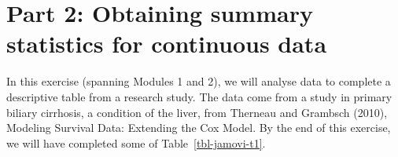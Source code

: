\documentclass[
  a4paper,
]{memoir}
\newcounter{none} %
\begin{document}
\section{Part 2: Obtaining summary statistics for continuous
data}\label{part-2-obtaining-summary-statistics-for-continuous-data}

In this exercise (spanning Modules 1 and 2), we will analyse data to
complete a descriptive table from a research study. The data come from a
study in primary biliary cirrhosis, a condition of the liver, from
Therneau and Grambsch (2010), Modeling Survival Data: Extending the Cox
Model. By the end of this exercise, we will have completed some of
Table~\ref{tbl-jamovi-t1}.

\begin{table}[h]

\caption{\label{tbl-jamovi-t1}Summary of 418 participants from the PBC
study (Therneau and Grambsch, 2000)}


\end{table}%
\end{document}
